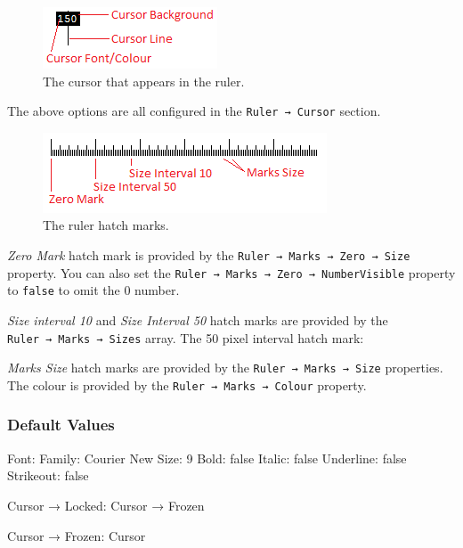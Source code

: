 \documentclass[
]{book}
\newenvironment{Shaded}{\begin{snugshade}}{\end{snugshade}}
\newcommand{\CommentTok}[1]{\textcolor[rgb]{0.56,0.35,0.01}{\textit{#1}}}
\begin{document}
\begin{figure}
\centering
\includegraphics{images/ruler-cursor.png}
\caption{\label{fig:unnamed-chunk-4}The cursor that appears in the ruler.}
\end{figure}

The above options are all configured in the \texttt{Ruler\ →\ Cursor} section.

\begin{figure}
\centering
\includegraphics{images/ruler-hashmarks.png}
\caption{\label{fig:unnamed-chunk-5}The ruler hatch marks.}
\end{figure}

\emph{Zero Mark} hatch mark is provided by the \texttt{Ruler\ →\ Marks\ →\ Zero\ →\ Size} property.
You can also set the \texttt{Ruler\ →\ Marks\ →\ Zero\ →\ NumberVisible} property to \texttt{false} to omit the 0 number.

\emph{Size interval 10} and \emph{Size Interval 50} hatch marks are provided by the \texttt{Ruler\ →\ Marks\ →\ Sizes} array.
The 50 pixel interval hatch mark:

\begin{Shaded}
\end{Shaded}

\emph{Marks Size} hatch marks are provided by the \texttt{Ruler\ →\ Marks\ →\ Size} properties.
The colour is provided by the \texttt{Ruler\ →\ Marks\ →\ Colour} property.

\hypertarget{default-values}{%
\subsubsection{Default Values}\label{default-values}}

Font:
Family: Courier New
Size: 9
Bold: false
Italic: false
Underline: false
Strikeout: false

Cursor → Locked:
Cursor → Frozen

Cursor → Frozen:
Cursor
\end{document}
